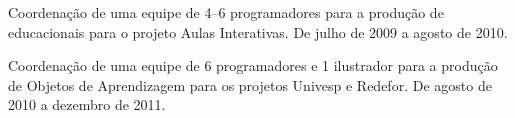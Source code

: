 \begin{compactitem}
	\item Coordenação de uma equipe de 4--6 programadores para a produção de  educacionais para o projeto Aulas Interativas. De julho de 2009 a agosto de 2010.
	\item Coordenação de uma equipe de 6 programadores e 1 ilustrador para a produção de Objetos de Aprendizagem para os projetos Univesp e Redefor. De agosto de 2010 a dezembro de 2011.
\end{compactitem}


	


